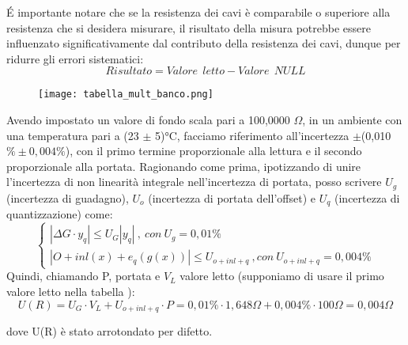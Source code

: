 \'E importante notare che se la resistenza dei cavi è comparabile o superiore alla resistenza che si desidera misurare, il risultato della misura potrebbe essere influenzato significativamente dal contributo della resistenza dei cavi, dunque per ridurre gli errori sistematici:
\begin{equation*}
    Risultato = Valore \ \ letto - Valore\ \ NULL
\end{equation*}

\begin{figure}[h]
    \centering
    \texttt{[image: tabella\_mult\_banco.png]}
    \label{fig:tab_mult_banco}
\end{figure}
\FloatBarrier

Avendo impostato un valore di fondo scala pari a 100,0000 $\Omega$, in un ambiente con una temperatura pari a (23 $\pm$ 5)°C, facciamo riferimento all'incertezza $\pm$(0,010 $\% \pm 0,004 \%$), con il primo termine proporzionale alla lettura e il secondo proporzionale alla portata.
Ragionando come prima, ipotizzando di unire l'incertezza di non linearità integrale nell'incertezza di portata, posso scrivere $U_g$ (incertezza di guadagno), $U_o$ (incertezza di portata dell'offset) e $U_q$ (incertezza di quantizzazione) come: 
\begin{equation}
\left\{\begin{array}{l}
| \Delta G \cdot y_q | \leq U_G |y_q| \ , \ con \ U_g=0,01\% \\ 
| O + inl(x) + e_q(g(x)) | \leq U_{o+inl+q} \ , con \ U_{o+inl+q}=0,004\%
\end{array}\right.
\end{equation}
Quindi, chiamando P, portata e $V_L$ valore letto (supponiamo di usare il primo valore letto nella tabella \label{mult_port}):
\begin{equation*}
    U(R) = U_G \cdot V_L + U_{o+inl+q} \cdot P = 0,01\% \cdot 1,648\Omega + 0,004 \% \cdot 100 \Omega = 0,004 \Omega 
\end{equation*}

dove U(R) è stato arrotondato per difetto.

